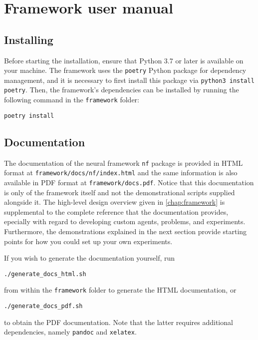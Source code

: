 \chapter{Framework user manual}
\label{app:framework_user_manual}

\section{Installing}
Before starting the installation, ensure that Python 3.7 or later is available on your machine. 
The framework uses the \texttt{poetry} Python package for dependency management, and it is necessary to first install this package via \texttt{python3 install poetry}. 
Then, the framework's dependencies can be installed by running the following command in the \texttt{framework} folder:
\begin{verbatim}
poetry install
\end{verbatim}

\section{Documentation}
The documentation of the neural framework \texttt{nf} package is provided in HTML format at \texttt{framework/docs/nf/index.html} and the same information is also available in PDF format at \texttt{framework/docs.pdf}.
Notice that this documentation is only of the framework itself and not the demonstrational scripts supplied alongside it.
The high-level design overview given in \ref{chap:framework} is supplemental to the complete reference that the documentation provides, epecially with regard to developing custom agents, problems, and experiments.
Furthermore, the demonstrations explained in the next section provide starting points for how you could set up your own experiments.

If you wish to generate the documentation yourself, run
\begin{verbatim}
./generate_docs_html.sh
\end{verbatim}
from within the \texttt{framework} folder to generate the HTML documentation, or
\begin{verbatim}
./generate_docs_pdf.sh
\end{verbatim}
to obtain the PDF documentation. 
Note that the latter requires additional dependencies, namely \texttt{pandoc} and \texttt{xelatex}.

